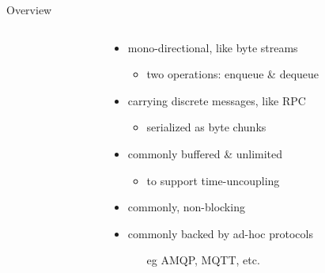 \documentclass{beamer}\mode<presentation>{\usetheme{AMSBolognaFC}}
\begin{document}
\begin{frame}{Overview}
\begin{columns}
\begin{column}{.26\linewidth}
\begin{center}
            \end{center}
        \end{column}
        \hfill
        \begin{column}{.72\linewidth}
            \begin{itemize}
                \item \alert{mono-directional}, like byte streams
                \begin{itemize}
                    \item two operations: enqueue \& dequeue
                \end{itemize}

                \smallskip

                \item carrying discrete \alert{messages}, like RPC
                \begin{itemize}
                    \item serialized as byte chunks
                \end{itemize}

                \smallskip

                \item commonly \alert{buffered} \& unlimited
                \begin{itemize}
                    \item to support \alert{time-uncoupling}
                \end{itemize}

                \smallskip

                \item commonly, \alert{non-blocking}

                \smallskip

                \item commonly backed by ad-hoc \alert{protocols}
                \begin{itemize}
                    \item[eg] AMQP, MQTT, etc.
                \end{itemize}
            \end{itemize}
        \end{column}
    \end{columns}
\end{frame}
\end{document}
